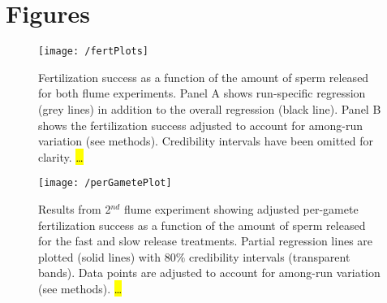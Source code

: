 \documentclass{article}
\begin{document}
\section*{Figures}
 
\begin{figure}[!ht] 
\texttt{[image: /fertPlots]}
\caption{Fertilization success as a function of the amount of sperm released for both flume experiments. Panel A shows run-specific regression (grey lines) in addition to the overall regression (black line). Panel B shows the fertilization success adjusted to account for among-run variation (see methods). Credibility intervals have been omitted for clarity. \hl{\ldots}}
\label{fig:fertPlots}
\end{figure}
\newpage{}


\begin{figure}[!ht] 
\texttt{[image: /perGametePlot]}
\caption{Results from 2$^{nd}$ flume experiment showing adjusted per-gamete fertilization success as a function of the amount of sperm released for the fast and slow release treatments. Partial regression lines are plotted (solid lines) with $80\%$ credibility intervals (transparent bands). Data points are adjusted to account for among-run variation (see methods).  \hl{\ldots}}
\label{fig:perGamete}
\end{figure}
\newpage{}




\renewcommand{\thefigure}{A\arabic{figure}}
\setcounter{figure}{0}





\end{document}
